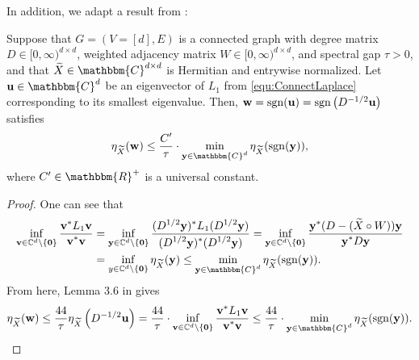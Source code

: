 

In addition, we adapt a result from \cite{Cheeger}:

\begin{lemma}  
Suppose that $G = (V=[d], E)$ is a connected graph with degree matrix $D \in [0,\infty)^{d \times d}$, weighted adjacency matrix $W \in [0,\infty)^{d \times d}$, and spectral gap $\tau > 0$, and that $\tX \in \mathbbm{C}^{d \times d}$ is Hermitian and entrywise normalized.  Let ${\bf u} \in \mathbbm{C}^d$ be an eigenvector of $L_1$ from \eqref{equ:ConnectLaplace} corresponding to its smallest eigenvalue.  Then, ${\bf w} = \mathrm{sgn}({\bf u}) = \mathrm{sgn} \left( D^{-1/2}{\bf u} \right)$ satisfies \[\eta_{\tX}({\bf w}) \le \bigfrac{C'}{\tau} \cdot \min_{{\bf y} \in \mathbbm{C}^d} \eta_{\tX}( \sgn({\bf y}) ),\] where $C' \in \mathbbm{R}^+$ is a universal constant.
\label{lem:CheegerInequality}
\end{lemma}

\begin{proof}  
 One can see that 
\begin{align*}
\inf_{{\bf v} \in \C^d \setminus \{ \bf 0 \}} \bigfrac{{\bf v}^* L_1 {\bf v}}{{\bf v}^* {\bf v}} &= \inf_{{\bf y} \in \C^d \setminus \{ \bf 0 \}} \bigfrac{(D^{1/2}{\bf y})^* L_1 (D^{1/2} {\bf y})}{(D^{1/2}{\bf y})^*(D^{1/2} {\bf y})} = \inf_{{\bf y} \in \C^d \setminus \{ \bf 0 \} } \bigfrac{{\bf y}^*(D - (\tX \circ W)){\bf y}}{{\bf y}^* D {\bf y} } \\
&= \inf_{y \in \C^d \setminus \{ \bf 0 \}} \eta_{\tX}({\bf y}) \le \min_{{\bf y} \in \mathbbm{C}^d} \eta_{\tX}( \sgn({\bf y}) ).  
\end{align*}
From here, Lemma 3.6 in \cite{Cheeger} gives \[\eta_{\tX}({\bf w}) \le \bigfrac{44}{\tau} \eta_{\tX}\left( D^{-1/2}{\bf u} \right) = \bigfrac{44}{\tau} \cdot \inf_{{\bf v} \in \C^d \setminus \{ \bf 0 \}} \bigfrac{{\bf v}^* L_1 {\bf v}}{{\bf v}^* {\bf v}} \le \bigfrac{44}{\tau} \cdot \min_{{\bf y} \in \mathbbm{C}^d} \eta_{\tX}( \sgn({\bf y}) ).\]
\end{proof}

